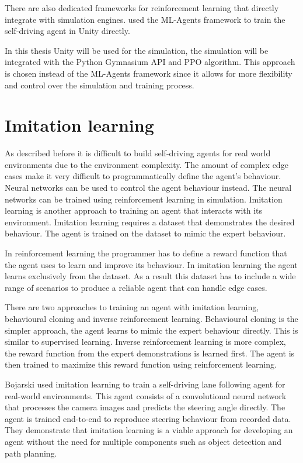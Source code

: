 There are also dedicated frameworks for reinforcement learning that directly integrate with simulation engines. \textcite{maximilian} used the ML-Agents framework \textcite{mlagents} to train the self-driving agent in Unity directly.

In this thesis Unity will be used for the simulation, the simulation will be integrated with the Python Gymnasium API and PPO algorithm. This approach is chosen instead of the ML-Agents framework since it allows for more flexibility and control over the simulation and training process.


\section{Imitation learning}
As described before it is difficult to build self-driving agents for real world environments due to the environment complexity. The amount of complex edge cases make it very difficult to programmatically define the agent's behaviour. Neural networks can be used to control the agent behaviour instead. The neural networks can be trained using reinforcement learning in simulation. 
Imitation learning is another approach to training an agent that interacts with its environment. Imitation learning requires a dataset that demonstrates the desired behaviour. The agent is trained on the dataset to mimic the expert behaviour.

In reinforcement learning the programmer has to define a reward function that the agent uses to learn and improve its behaviour. In imitation learning the agent learns exclusively from the dataset. As a result this dataset has to include a wide range of scenarios to produce a reliable agent that can handle edge cases.

There are two approaches to training an agent with imitation learning, behavioural cloning and inverse reinforcement learning. Behavioural cloning is the simpler approach, the agent learns to mimic the expert behaviour directly. This is similar to supervised learning. Inverse reinforcement learning is more complex, the reward function from the expert demonstrations is learned first. The agent is then trained to maximize this reward function using reinforcement learning. 

Bojarski \textcite{bojarski2016endToEnd} used imitation learning to train a self-driving lane following agent for real-world environments. This agent consists of a convolutional neural network that processes the camera images and predicts the steering angle directly. The agent is trained end-to-end to reproduce steering behaviour from recorded data. They demonstrate that imitation learning is a viable approach for developing an agent without the need for multiple components such as object detection and path planning.

